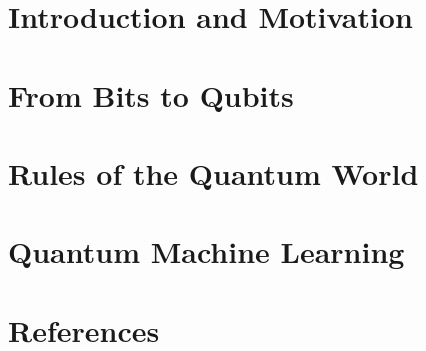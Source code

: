 
\section[Intro]{Introduction and Motivation}


\section[Bits]{From Bits to Qubits}


\section[Rules]{Rules of the Quantum World}


% 

\section[QML]{Quantum Machine Learning}

% 

\section[Refs]{References}

